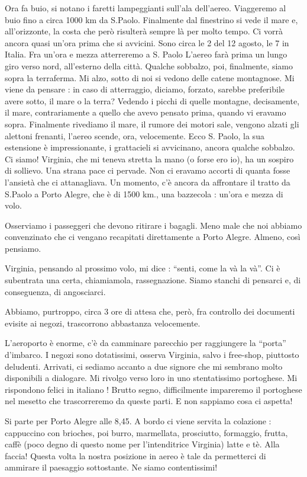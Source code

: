 \documentclass[a4paper,10pt]{book}
\begin{document}
Ora fa buio, si notano i faretti lampeggianti sull’ala dell’aereo. Viaggeremo al buio fino a circa 1000 km da S.Paolo. Finalmente dal finestrino si vede il mare e, all’orizzonte, la costa che però risulterà sempre là per molto tempo. Ci vorrà ancora quasi un’ora prima che si avvicini. Sono circa le 2 del 12 agosto, le 7 in Italia. Fra un’ora e mezza atterreremo a S. Paolo L’aereo farà prima un lungo giro verso nord, all’esterno della città.
Qualche sobbalzo, poi, finalmente, siamo sopra la terraferma. Mi alzo, sotto di noi si vedono delle catene montagnose.
Mi viene da pensare : in caso di atterraggio, diciamo, forzato, sarebbe preferibile avere sotto, il mare o la terra? Vedendo i picchi di quelle montagne, decisamente, il mare, contrariamente a quello che avevo pensato prima, quando vi eravamo sopra.
Finalmente rivediamo il mare, il rumore dei motori sale, vengono alzati gli alettoni frenanti, l’aereo scende, ora, velocemente.
Ecco S. Paolo, la sua estensione è impressionante, i grattacieli si avvicinano, ancora qualche sobbalzo. Ci siamo!
Virginia, che mi teneva stretta la mano (o forse ero io), ha un sospiro di sollievo. Una strana pace ci pervade. Non ci eravamo accorti di quanta fosse l’ansietà che ci attanagliava. 
Un momento, c’è ancora da affrontare il tratto da S.Paolo a Porto Alegre, che è di 1500 km., una bazzecola : un’ora e mezza di volo.

Osserviamo i passeggeri che devono ritirare i bagagli. Meno male che noi abbiamo convenzinato che ci vengano recapitati direttamente a Porto Alegre. Almeno, così pensiamo.

Virginia, pensando al prossimo volo, mi dice : “senti, come la và la và”. Ci è subentrata una certa, chiamiamola, rassegnazione. Siamo stanchi di pensarci e, di conseguenza, di angosciarci. 

Abbiamo, purtroppo, circa 3 ore di attesa che, però, fra controllo dei documenti evisite ai negozi,  trascorrono abbastanza velocemente. 

L’aeroporto è enorme, c’è da camminare parecchio per raggiungere la “porta” d’imbarco. I negozi sono dotatissimi, osserva Virginia, salvo i free-shop, piuttosto deludenti. Arrivati, ci sediamo accanto a due signore che mi sembrano molto disponibili a dialogare. Mi rivolgo verso loro in uno stentatissimo portoghese. Mi rispondono felici in italiano ! Brutto segno, difficilmente impareremo il portoghese nel mesetto che trascorreremo da queste parti. E non sappiamo cosa ci aspetta!

Si parte per Porto Alegre alle 8,45. A bordo ci viene servita la colazione : cappuccino con brioches, poi burro, marmellata, prosciutto, formaggio, frutta, caffè (poco degno di questo nome per l’intenditrice Virginia) latte e tè. Alla faccia!
Questa volta la nostra posizione in aereo è tale da permetterci di ammirare il paesaggio sottostante. Ne siamo contentissimi!
\end{document}
